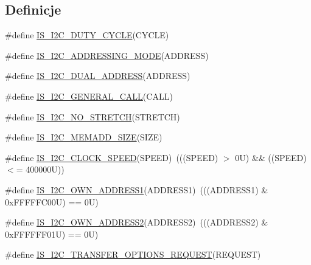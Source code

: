 \subsection*{Definicje}
\begin{DoxyCompactItemize}
\item 
\#define \hyperlink{group___i2_c___i_s___r_t_c___definitions_gae9b3276d9b6ec872ee4fafa2b2fafb83}{I\+S\+\_\+\+I2\+C\+\_\+\+D\+U\+T\+Y\+\_\+\+C\+Y\+C\+LE}(C\+Y\+C\+LE)
\item 
\#define \hyperlink{group___i2_c___i_s___r_t_c___definitions_gabfbd7569fe1512aea1cf507afc05e5fe}{I\+S\+\_\+\+I2\+C\+\_\+\+A\+D\+D\+R\+E\+S\+S\+I\+N\+G\+\_\+\+M\+O\+DE}(A\+D\+D\+R\+E\+SS)
\item 
\#define \hyperlink{group___i2_c___i_s___r_t_c___definitions_gae683c113d4088dfae90fbe6677f8296a}{I\+S\+\_\+\+I2\+C\+\_\+\+D\+U\+A\+L\+\_\+\+A\+D\+D\+R\+E\+SS}(A\+D\+D\+R\+E\+SS)
\item 
\#define \hyperlink{group___i2_c___i_s___r_t_c___definitions_ga36a9a7855d7f35a6b03b05c6079bf149}{I\+S\+\_\+\+I2\+C\+\_\+\+G\+E\+N\+E\+R\+A\+L\+\_\+\+C\+A\+LL}(C\+A\+LL)
\item 
\#define \hyperlink{group___i2_c___i_s___r_t_c___definitions_gaf7d844f7c7f5c96067468ab47971d0fd}{I\+S\+\_\+\+I2\+C\+\_\+\+N\+O\+\_\+\+S\+T\+R\+E\+T\+CH}(S\+T\+R\+E\+T\+CH)
\item 
\#define \hyperlink{group___i2_c___i_s___r_t_c___definitions_gace95d2b6add7feef5805f1fa6d2e46be}{I\+S\+\_\+\+I2\+C\+\_\+\+M\+E\+M\+A\+D\+D\+\_\+\+S\+I\+ZE}(S\+I\+ZE)
\item 
\#define \hyperlink{group___i2_c___i_s___r_t_c___definitions_gae0d731df1b264d853703716c29309b9b}{I\+S\+\_\+\+I2\+C\+\_\+\+C\+L\+O\+C\+K\+\_\+\+S\+P\+E\+ED}(S\+P\+E\+ED)~(((S\+P\+E\+ED) $>$ 0\+U) \&\& ((\+S\+P\+E\+E\+D) $<$= 400000\+U))
\item 
\#define \hyperlink{group___i2_c___i_s___r_t_c___definitions_gad84e8b9523d45b6105b4d5cb68994a79}{I\+S\+\_\+\+I2\+C\+\_\+\+O\+W\+N\+\_\+\+A\+D\+D\+R\+E\+S\+S1}(A\+D\+D\+R\+E\+S\+S1)~(((A\+D\+D\+R\+E\+S\+S1) \& 0x\+F\+F\+F\+F\+F\+C00\+U) == 0\+U)
\item 
\#define \hyperlink{group___i2_c___i_s___r_t_c___definitions_ga83001d53612b83ee90730d3bb2732537}{I\+S\+\_\+\+I2\+C\+\_\+\+O\+W\+N\+\_\+\+A\+D\+D\+R\+E\+S\+S2}(A\+D\+D\+R\+E\+S\+S2)~(((A\+D\+D\+R\+E\+S\+S2) \& 0x\+F\+F\+F\+F\+F\+F01\+U) == 0\+U)
\item 
\#define \hyperlink{group___i2_c___i_s___r_t_c___definitions_ga8f3522af9ffef268641698ac80f77859}{I\+S\+\_\+\+I2\+C\+\_\+\+T\+R\+A\+N\+S\+F\+E\+R\+\_\+\+O\+P\+T\+I\+O\+N\+S\+\_\+\+R\+E\+Q\+U\+E\+ST}(R\+E\+Q\+U\+E\+ST)

\end{DoxyCompactItemize}
